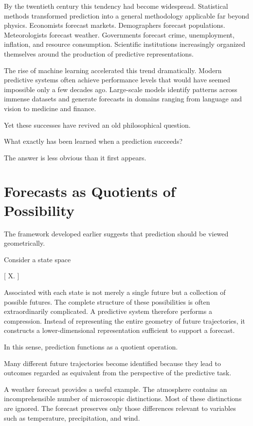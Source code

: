 \documentclass[11pt,oneside,openany]{book}
\begin{document}
By the twentieth century this tendency had become widespread. Statistical methods transformed prediction into a general methodology applicable far beyond physics. Economists forecast markets. Demographers forecast populations. Meteorologists forecast weather. Governments forecast crime, unemployment, inflation, and resource consumption. Scientific institutions increasingly organized themselves around the production of predictive representations.

The rise of machine learning accelerated this trend dramatically. Modern predictive systems often achieve performance levels that would have seemed impossible only a few decades ago. Large-scale models identify patterns across immense datasets and generate forecasts in domains ranging from language and vision to medicine and finance.

Yet these successes have revived an old philosophical question.

What exactly has been learned when a prediction succeeds?

The answer is less obvious than it first appears.

\section{Forecasts as Quotients of Possibility}

The framework developed earlier suggests that prediction should be viewed geometrically.

Consider a state space

[
\mathcal X.
]

Associated with each state is not merely a single future but a collection of possible futures. The complete structure of these possibilities is often extraordinarily complicated. A predictive system therefore performs a compression. Instead of representing the entire geometry of future trajectories, it constructs a lower-dimensional representation sufficient to support a forecast.

In this sense, prediction functions as a quotient operation.

Many different future trajectories become identified because they lead to outcomes regarded as equivalent from the perspective of the predictive task.

A weather forecast provides a useful example. The atmosphere contains an incomprehensible number of microscopic distinctions. Most of these distinctions are ignored. The forecast preserves only those differences relevant to variables such as temperature, precipitation, and wind.
\end{document}
